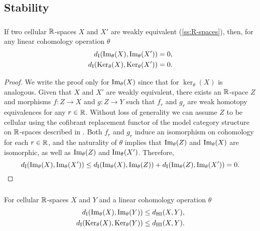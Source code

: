 \subsection{Stability}\label{ss:stability}

\subsubsection{}\label{lem:w.h.e. preservance}

\lemma If two cellular $\mathbb{R}$-spaces $X$ and $X'$ are weakly equivalent (\cref{ss:R-spaces}), then, for any linear cohomology operation $\theta$
\[
\begin{split}
	d_{\mathrm{I}}(\operatorname{Im}_\theta(X), \operatorname{Im}_\theta(X')) &= 0, \\
	d_{\mathrm{I}}(\operatorname{Ker}_\theta(X), \operatorname{Ker}_\theta(X')) &= 0.
\end{split}
\]

\begin{proof}
	We write the proof only for $\operatorname{Im}_\theta(X)$ since that for $\ker_\theta(X)$ is analogous.
	Given that $X$ and $X'$ are weakly equivalent, there exists an $\mathbb{R}$-space $Z$ and morphisms $f \colon Z \to X$ and $g \colon Z \to Y$ such that $f_r$ and $g_r$ are weak homotopy equivalences for any $r \in \mathbb{R}$.
	Without loss of generality we can assume $Z$ to be cellular using the cofibrant replacement functor of the model category structure on $\mathbb{R}$-spaces described in \cite{blumberg2023interleaving}.
	Both $f_r$ and $g_r$ induce an isomorphism on cohomology for each $r \in \mathbb{R}$, and the naturality of $\theta$ implies that $\operatorname{Im}_\theta(Z)$ and $\operatorname{Im}_\theta(X)$ are isomorphic, as well as $\operatorname{Im}_\theta(Z)$ and $\operatorname{Im}_\theta(X')$.
	Therefore,
	\[
	d_{\mathrm{I}}(\operatorname{Im}_\theta(X),\operatorname{Im}_\theta(X')) \leq
	d_{\mathrm{I}}(\operatorname{Im}_\theta(X),\operatorname{Im}_\theta(Z)) + d_{\mathrm{I}}(\operatorname{Im}_\theta(Z),\operatorname{Im}_\theta(X')) =
	0.\qedhere
	\]
\end{proof}

\subsubsection{}\label{thm:theta stability}

\lemma
For cellular $\mathbb{R}$-spaces $X$ and $Y$ and a linear cohomology operation $\theta$
\begin{align*}
	d_{\mathrm{I}}(\operatorname{Im}_\theta(X), \operatorname{Im}_\theta(Y)) &\leq d_{\mathrm{HI}}(X,Y), \\
	d_{\mathrm{I}}(\operatorname{Ker}_\theta(X), \operatorname{Ker}_\theta(Y)) &\leq d_{\mathrm{HI}}(X,Y).
\end{align*}

